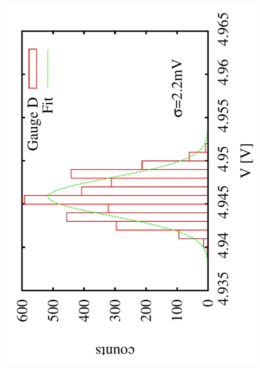 \documentclass[a4paper,11pt]{book}
\begin{document}
 \includegraphics[scale=0.15,angle=-90]{image_ai_24e3.pdf}\par
\end{document}
